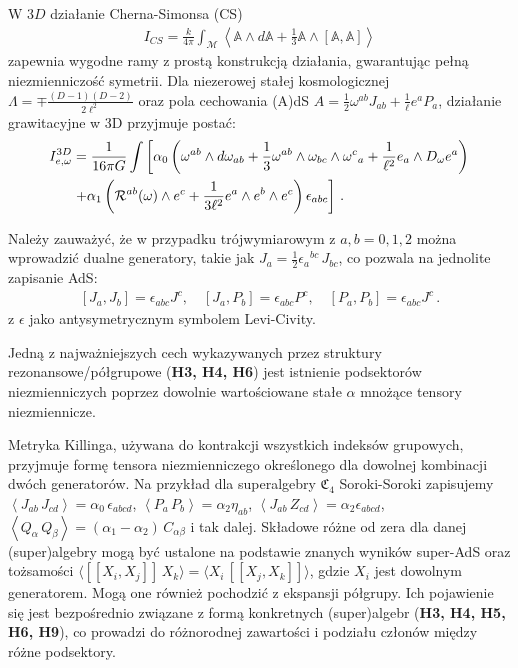 \documentclass[12pt,a4paper]{article}
\begin{document}
W $3D$ działanie Cherna-Simonsa (CS)
\begin{align}\label{CS}
	I_{CS} = \frac{k}{4\pi} \int_{\mathcal{M}} \left\langle \mathbb{A} \wedge d\mathbb{A} + \frac{1}{3} \mathbb{A} \wedge [\mathbb{A}, \mathbb{A}] \right\rangle
\end{align}
zapewnia wygodne ramy z prostą konstrukcją działania, gwarantując pełną niezmienniczość symetrii. Dla niezerowej stałej kosmologicznej \(\Lambda = \mp \frac{(D-1)(D-2)}{2\ell^{2}}\) oraz pola cechowania (A)dS $A = \frac{1}{2}\omega^{ab} J_{ab} + \frac{1}{\ell} e^{a} P_{a}$, działanie grawitacyjne w 3D przyjmuje postać:
\begin{align}
	I^{3D}_{e,\omega}&=\frac{1}{16\pi G}\int \left[ \alpha _{0}\left(
	\omega^{ab}\wedge d\omega _{ab}+\frac{1}{3}\omega^{ab} \wedge \omega
	_{bc}\wedge \omega^{c}{}_{a}+\frac{1}{\ell^2}e_{a} \wedge D_{\omega }e^{a} \right) \right.  \notag \\
	&\left. +\alpha_{1}\left(\mathcal{R}^{ab}(\omega)\wedge e^{c}+\frac{1}{3\ell^2}e^{a} \wedge e^{b} \wedge e^{c}\right) \epsilon
	_{abc}\right] \,.
\end{align}

Należy zauważyć, że w przypadku trójwymiarowym z $a,b=0,1,2$ można wprowadzić dualne generatory, takie jak $J_{a}=\frac{1}{2}\epsilon_{a}{}^{bc}\,J_{bc}$, co pozwala na jednolite zapisanie AdS:
\begin{align}
	\left[ J_{a},J_{b}\right] =\epsilon_{abc}J^{c},\quad
	\left[ J_{a},P_{b}\right] =\epsilon _{abc}P^{c},\quad
	\left[ P_{a},P_{b}\right] =\epsilon _{abc}J^{c}\,.
\end{align}
z $\epsilon$ jako antysymetrycznym symbolem Levi-Civity.

Jedną z najważniejszych cech wykazywanych przez struktury rezonansowe/półgrupowe (\textbf{H3, H4, H6}) jest istnienie podsektorów niezmienniczych poprzez dowolnie wartościowane stałe $\alpha$ mnożące tensory niezmiennicze.

Metryka Killinga, używana do kontrakcji wszystkich indeksów grupowych, przyjmuje formę tensora niezmienniczego określonego dla dowolnej kombinacji dwóch generatorów. Na przykład dla superalgebry $\mathfrak{C}_4$ Soroki-Soroki zapisujemy $\left\langle J_{ab}\,J_{cd}\right\rangle =\alpha_{0}\,\epsilon_{abcd}$, $\left\langle P_{a}\,P_{b}\right\rangle =\alpha_2 \eta_{ab}$, $\left\langle J_{ab}\,Z_{cd}\right\rangle =\alpha_{2}\epsilon_{abcd}$, $\left\langle Q_\alpha\, Q_\beta\right\rangle=(\alpha_1-\alpha_2)\,C_{\alpha\beta}$ i tak dalej. Składowe różne od zera dla danej (super)algebry mogą być ustalone na podstawie znanych wyników super-AdS oraz tożsamości $\langle[[X_i, X_j ]]\, X_k \rangle =\langle X_i \, [[X_j, X_k]] \rangle$, gdzie $X_i$ jest dowolnym generatorem. Mogą one również pochodzić z ekspansji półgrupy. Ich pojawienie się jest bezpośrednio związane z formą konkretnych (super)algebr (\textbf{H3, H4, H5, H6, H9}), co prowadzi do różnorodnej zawartości i podziału członów między różne podsektory.
\end{document}
